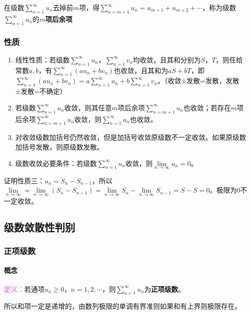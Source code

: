 在级数$\sum\limits_{n=1}^\infty u_n$去掉前$m$项，得$\sum\limits_{n=m+1}^\infty u_n=u_{m+1}+u_{m+2}+\cdots$，称为级数$\sum\limits_{n=1}^\infty u_n$的\textbf{$m$项后余项}

\subsubsection{性质}

\begin{enumerate}
    \item 线性性质：若级数$\sum\limits_{n=1}^\infty u_n$，$\sum\limits_{n=1}^\infty v_n$均收敛，且其和分别为$S$，$T$，则任给常数$a,b$，有$\sum\limits_{n=1}^\infty(au_n+bv_n)$也收敛，且其和为$aS+bT$，即$\sum\limits_{n=1}^\infty(au_n+bv_n)=a\sum\limits_{n=1}^\infty u_n+b\sum\limits_{n=1}^\infty v_n$。（收敛±发散=发散，发散±发散=不确定）
    \item 若级数$\sum\limits_{n=1}^\infty u_n$收敛，则其任意$m$项后余项$\sum\limits_{n=m+1}^\infty u_n$也收敛；若存在$m$项后余项$\sum\limits_{n=m+1}^\infty u_n$收敛，则$\sum\limits_{n=1}^\infty u_n$也收敛。
    \item 对收敛级数加括号仍然收敛，但是加括号收敛原级数不一定收敛。如果原级数加括号发散，则原级数发散。
    \item 级数收敛必要条件：若级数$\sum\limits_{n=1}^\infty u_n$收敛，则$\lim\limits_{n\to\infty}u_n=0$。
\end{enumerate}

证明性质三：$u_n=S_n-S_{n-1}$，所以$\lim\limits_{n\to\infty}=\lim\limits_{n\to\infty}(S_n-S_{n-1})=\lim\limits_{n\to\infty}S_n-\lim\limits_{n\to\infty}S_{n-1}=S-S=0$。极限为0不一定收敛。

\subsection{级数敛散性判别}

\subsubsection{正项级数}

\paragraph{概念} \leavevmode \medskip

\textcolor{violet}{\textbf{定义：}}若通项$u_n\geqslant0$，$n=1,2,\cdots$，则$\sum\limits_{n=1}^\infty u_n$为\textbf{正项级数}。

所以和项一定是递增的，由数列极限的单调有界准则如果和有上界则极限存在。

